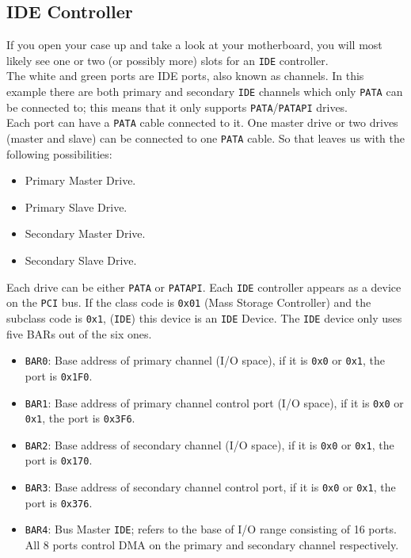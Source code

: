 \documentclass{42-en}
\begin{document}
    \subsection{IDE Controller}
    If you open your case up and take a look at your motherboard, you will most
    likely see one or two (or possibly more) slots for an \texttt{IDE}
    controller.\\
    The white and green ports are IDE ports, also known as
    channels. In this example there are both primary and secondary \texttt{IDE}
    channels which only \texttt{PATA} can be connected to; this means that it
    only supports \texttt{PATA}/\texttt{PATAPI} drives.\\
    Each port can have a \texttt{PATA} cable connected to it. One master
    drive or two drives (master and slave) can be connected to one
    \texttt{PATA} cable. So that leaves us with the following possibilities:
    \begin{itemize}\itemsep1pt
        \item Primary Master Drive.
        \item Primary Slave Drive.
        \item Secondary Master Drive.
        \item Secondary Slave Drive.
    \end{itemize}
    Each drive can be either \texttt{PATA} or \texttt{PATAPI}.  Each
    \texttt{IDE} controller appears as a device on the \texttt{PCI} bus. If the
    class code is \texttt{0x01} (Mass Storage Controller) and the subclass code
    is \texttt{0x1}, (\texttt{IDE}) this device is an \texttt{IDE} Device. The
    \texttt{IDE} device only uses five BARs out of the six ones.
    \begin{itemize}\itemsep1pt
    \item \texttt{BAR0}: Base address of primary channel (I/O space),
        if it is \texttt{0x0} or \texttt{0x1}, the port is \texttt{0x1F0}.
    \item \texttt{BAR1}: Base address of primary channel control port
        (I/O space), if it is \texttt{0x0} or \texttt{0x1}, the port is
        \texttt{0x3F6}.
    \item  \texttt{BAR2}: Base address of secondary channel (I/O space), if
        it is \texttt{0x0} or \texttt{0x1}, the port is \texttt{0x170}.
    \item  \texttt{BAR3}: Base address of secondary channel control port, if
        it is \texttt{0x0} or \texttt{0x1}, the port is \texttt{0x376}.
    \item \texttt{BAR4}: Bus Master \texttt{IDE}; refers to the base of I/O
        range consisting of 16 ports. All 8 ports control DMA on the primary
        and secondary channel respectively.
    \end{itemize}
\end{document}
